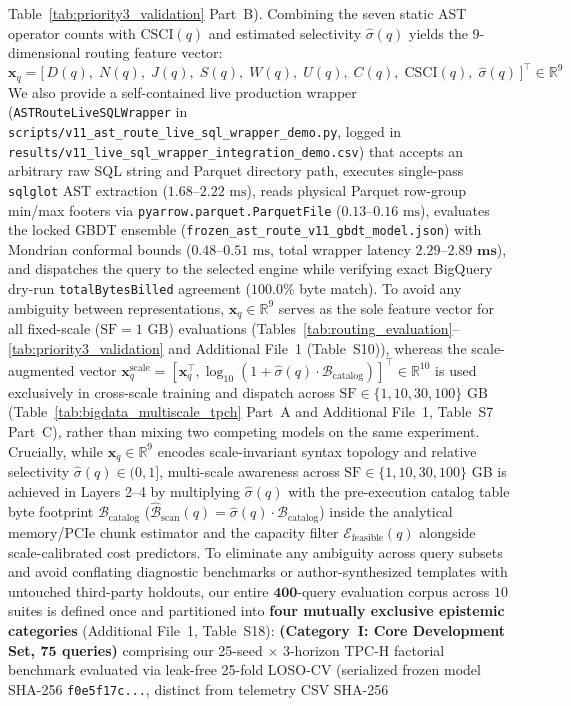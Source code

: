 \documentclass[10pt,a4paper]{article}
\begin{document}
Table~\ref{tab:priority3_validation} Part~B). Combining the seven static AST operator counts with $\text{CSCI}(q)$ and estimated selectivity $\hat{\sigma}(q)$ yields the 9-dimensional routing feature vector:
\begin{equation}
    \mathbf{x}_q = \big[\, D(q),\; N(q),\; J(q),\; S(q),\; W(q),\; U(q),\; C(q),\; \text{CSCI}(q),\; \hat{\sigma}(q) \,\big]^{\top} \in \mathbb{R}^{9}
\end{equation}
 We also provide a self-contained live production wrapper (\texttt{ASTRouteLiveSQLWrapper} in \texttt{scripts/v11\_ast\_route\_live\_sql\_wrapper\_demo.py}, logged in \texttt{results/v11\_live\_sql\_wrapper\_integration\_demo.csv}) that accepts an arbitrary raw SQL string and Parquet directory path, executes single-pass \texttt{sqlglot} AST extraction ($1.68\text{--}2.22\text{ ms}$), reads physical Parquet row-group min/max footers via \texttt{pyarrow.parquet.ParquetFile} ($0.13\text{--}0.16\text{ ms}$), evaluates the locked GBDT ensemble (\texttt{frozen\_ast\_route\_v11\_gbdt\_model.json}) with Mondrian conformal bounds ($0.48\text{--}0.51\text{ ms}$, total wrapper latency $\mathbf{2.29\text{--}2.89\text{ ms}}$), and dispatches the query to the selected engine while verifying exact BigQuery dry-run \texttt{totalBytesBilled} agreement ($100.0\%$ byte match). To avoid any ambiguity between representations, $\mathbf{x}_q \in \mathbb{R}^{9}$ serves as the sole feature vector for all fixed-scale ($\text{SF}=1\text{ GB}$) evaluations (Tables~\ref{tab:routing_evaluation}--\ref{tab:priority3_validation} and Additional File~1 (Table~S10)), whereas the scale-augmented vector $\mathbf{x}_q^{\text{scale}} = [\mathbf{x}_q^{\top}, \log_{10}(1+\hat{\sigma}(q)\cdot\mathcal{B}_{\text{catalog}})]^{\top} \in \mathbb{R}^{10}$ is used exclusively in cross-scale training and dispatch across $\text{SF}\in\{1,10,30,100\}\text{ GB}$ (Table~\ref{tab:bigdata_multiscale_tpch} Part~A and Additional File~1, Table~S7 Part~C), rather than mixing two competing models on the same experiment. Crucially, while $\mathbf{x}_q \in \mathbb{R}^9$ encodes scale-invariant syntax topology and relative selectivity $\hat{\sigma}(q) \in (0,1]$, multi-scale awareness across $\text{SF} \in \{1, 10, 30, 100\}$ GB is achieved in Layers 2--4 by multiplying $\hat{\sigma}(q)$ with the pre-execution catalog table byte footprint $\mathcal{B}_{\text{catalog}}$ ($\hat{\mathcal{B}}_{\text{scan}}(q) = \hat{\sigma}(q)\cdot \mathcal{B}_{\text{catalog}}$) inside the analytical memory/PCIe chunk estimator and the capacity filter $\mathcal{E}_{\text{feasible}}(q)$ alongside scale-calibrated cost predictors. To eliminate any ambiguity across query subsets and avoid conflating diagnostic benchmarks or author-synthesized templates with untouched third-party holdouts, our entire $\mathbf{400}$-query evaluation corpus across $10$ suites is defined once and partitioned into \textbf{four mutually exclusive epistemic categories} (Additional File~1, Table~S18): \textbf{(Category~I: Core Development Set, $\mathbf{75}$ queries)} comprising our 25-seed $\times$ 3-horizon TPC-H factorial benchmark evaluated via leak-free 25-fold LOSO-CV (serialized frozen model SHA-256 \texttt{f0e5f17c...}, distinct from telemetry CSV SHA-256 
\end{document}
